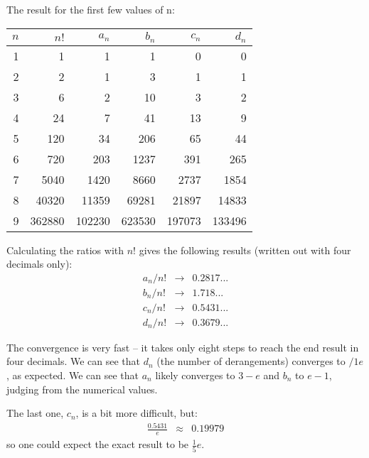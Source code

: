 \documentclass[onecolumn]{article}
\begin{document}
The result for the first few values of n:

\begin{table}[h!]
\begin{tabular}{rrrrrr}
$n$     &    $n!$     &    $a_n$    &    $b_n$    &    $c_n$ &    $d_n$    \\
\hline
 1      &      1      &      1      &      1      &      0   &      0      \\
 2      &      2      &      1      &      3      &      1   &      1      \\
 3      &      6      &      2      &     10      &      3   &      2      \\
 4      &     24      &      7      &     41      &     13   &      9      \\
 5      &    120      &     34      &    206      &     65   &     44      \\
 6      &    720      &    203      &   1237      &    391   &    265      \\
 7      &   5040      &   1420      &   8660      &   2737   &   1854      \\
 8      &  40320      &  11359      &  69281      &  21897   &  14833      \\
 9      & 362880      & 102230      & 623530      & 197073   & 133496      \\
\end{tabular}
\end{table}

Calculating the ratios with $n!$ gives the following results (written out with four decimals only):
\begin{eqnarray}
a_n / n! & \rightarrow & 0.2817...  \\
b_n / n! & \rightarrow & 1.718...   \\
c_n / n! & \rightarrow & 0.5431...  \\
d_n / n! & \rightarrow & 0.3679...
\end{eqnarray}

The convergence is very fast -- it takes only eight steps to reach the end result in four decimals.
We can see that $d_n$ (the number of derangements) converges to $/1e$, as expected. We can see that $a_n$ likely converges
to $3-e$ and $b_n$ to $e-1$, judging from the numerical values.

The last one, $c_n$, is a bit more difficult, but:
\begin{eqnarray}
\frac{0.5431}{e} & \approx & 0.19979
\end{eqnarray}
\noindent so one could expect the exact result to be $\frac{1}{5} e$.
\end{document}
